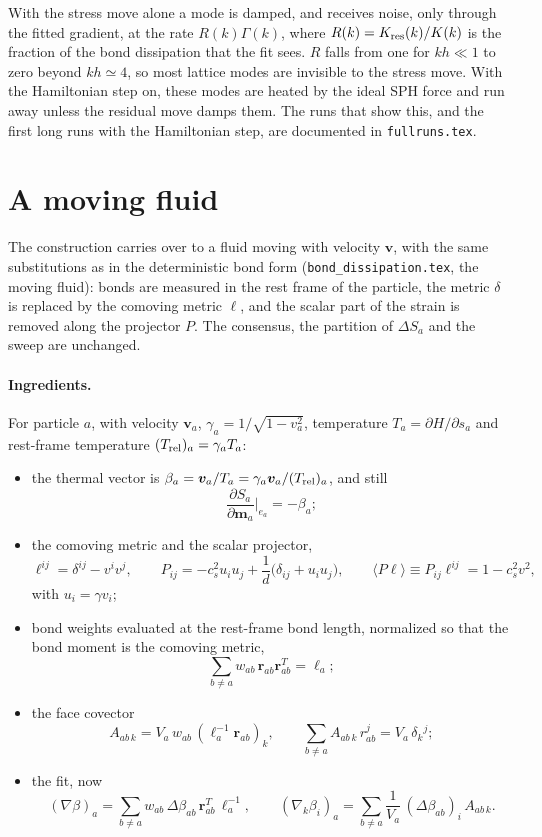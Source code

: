 \documentclass[11pt,aps,preprint,nofootinbib,superscriptaddress,tightenlines]{revtex4-2}
\def\st{\begin{equation}}
\def\stp{\end{equation}}
\newcommand{\avg}[1]{\langle #1\rangle}
\let\oldparagraph\paragraph
\renewcommand{\paragraph}{\par\bigskip\oldparagraph}
\begin{document}
With the stress move alone a mode is damped, and receives noise, only through
the fitted gradient, at the rate $R(k)\Gamma(k)$, where $R(k)=K_{\rm res}(k)/K(k)$ is the
fraction of the bond dissipation that the fit sees.  $R$ falls from one for
$kh\ll1$ to zero beyond $kh\simeq4$, so most lattice modes are invisible to the stress
move.  With the Hamiltonian step on, these modes are heated by the ideal SPH
force and run away unless the residual move damps them.  The runs that show
this, and the first long runs with the Hamiltonian step, are documented in
\texttt{fullruns.tex}.

\section{A moving fluid}
\label{sec:moving}

The construction carries over to a fluid moving with velocity $\bm v$, with
the same substitutions as in the deterministic bond form
(\texttt{bond\_dissipation.tex}, the moving fluid): bonds are measured in the
rest frame of the particle, the metric $\delta$ is replaced by the comoving
metric $\ell$, and the scalar part of the strain is removed along the projector
$P$.  The consensus, the partition of $\Delta S_a$ and the sweep are unchanged.

\paragraph{Ingredients.}  For particle $a$, with velocity $\bm v_a$,
$\gamma_a=1/\sqrt{1-v_a^2}$, temperature $T_a=\partial H/\partial s_a$ and rest-frame
temperature $(T_{\rm rel})_a=\gamma_aT_a$:
\begin{itemize}
\item the thermal vector is $\beta_a=\bm v_a/T_a=\gamma_a\bm v_a/(T_{\rm rel})_a$, and still
  \st
  \frac{\partial S_a}{\partial\bm m_a}\Big|_{e_a}=-\beta_a ;
  \stp
\item the comoving metric and the scalar projector,
  \st
  \ell^{ij}=\delta^{ij}-v^iv^j,\qquad
  P_{ij}=-c_s^2u_iu_j+\frac1d\big(\delta_{ij}+u_iu_j\big),\qquad
  \avg{P\ell}\equiv P_{ij}\ell^{ij}=1-c_s^2v^2 ,
  \stp
  with $u_i=\gamma v_i$;
\item bond weights evaluated at the rest-frame bond length, normalized so that
  the bond moment is the comoving metric,
  \st
  \sum_{b\neq a}w_{ab}\,\bm r_{ab}\bm r_{ab}^T=\ell_a ;
  \stp
\item the face covector
  \st
  A_{ab\,k}=V_a\,w_{ab}\,(\ell_a^{-1}\bm r_{ab})_k ,
  \qquad \sum_{b\neq a}A_{ab\,k}\,r^j_{ab}=V_a\,\delta_k{}^j ;
  \label{Amoving}
  \stp
\item the fit, now
  \st
  (\nabla\beta)_a=\sum_{b\neq a}w_{ab}\,\Delta\beta_{ab}\,\bm r_{ab}^T\,\ell_a^{-1},\qquad
  (\nabla_k\beta_i)_a=\sum_{b\neq a}\frac{1}{V_a}\,(\Delta\beta_{ab})_i\,A_{ab\,k} .
  \label{Gmoving}
  \stp
\end{itemize}
\end{document}
